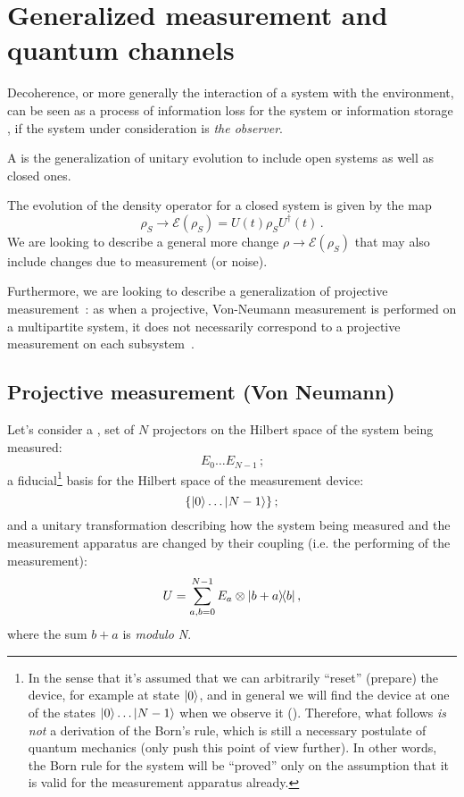 \section{Generalized measurement and quantum channels}

Decoherence,
or more generally the interaction of a system with the environment,
can be seen as a process of information loss for the system
\parencite[Ch. 9]{Nakahara} or information storage
\parencite{Zurek_Einselect}, if the system under consideration
is \emph{the observer}.

A  \parencite[Ch. 9]{Nakahara} is the generalization
of unitary evolution to include open systems as well as closed ones.

The evolution of the density operator for a closed system is given by the map
\[
    \rho_{S} \rightarrow \mathcal{E}(\rho_{S}) = U(t)\rho_{S}U^{\dagger}(t) \, \text{.}
\] 
We are looking to describe a general more change
$\rho \rightarrow \mathcal{E}(\rho_{S})$ that may also include
changes due to measurement (or noise).

Furthermore, we are looking to describe a generalization
of projective measurement~\parencite{VonNeumann}:
as when a projective, Von-Neumann
measurement is performed on a multipartite system,
it does not necessarily correspond to a projective measurement
on each subsystem~\parencite[Ch. 3]{PreskillNotes}.

\subsection{Projective measurement (Von Neumann)}

Let's consider a ,  set of $N$ projectors
on the Hilbert space
of the system being measured:
\[
  E_0 \dots E_{N-1} \,\text{;}
\]
a fiducial\footnote{
  In the sense that it's assumed
  that we can arbitrarily ``reset'' (prepare) the device,
  for example at state $\ket{0}$,
  and in general
  we will find the device at one of the states
  $\ket{0}\dots\ket{N-1}$
  when we observe it ().
  Therefore, what follows \emph{is not} a derivation of the Born's rule,
  which is still a necessary postulate of quantum mechanics
  (only \cite{Zurek_Decoherence, Zurek_Einselect, Zurek_Fundamentals} push
  this point of view further). In other words, the Born rule for the system
  will be ``proved''
  only on the assumption that it is valid for the measurement apparatus already.
}
basis for the Hilbert space of the measurement device:
\[
  \left\{\ket{0} \dots \ket{N-1}\right\} \text{;}
\]
and a unitary transformation describing how the
system being measured and the measurement apparatus
are changed by their coupling (i.e. the performing of the measurement):
\begin{equation}\label{eq:unitary_measurement}
  U = \sum_{a, b = 0}^{N-1} E_a \otimes \ketbra{b+a}{b} \text{,}
\end{equation}
where the sum $b+a$ is \emph{modulo N}.

